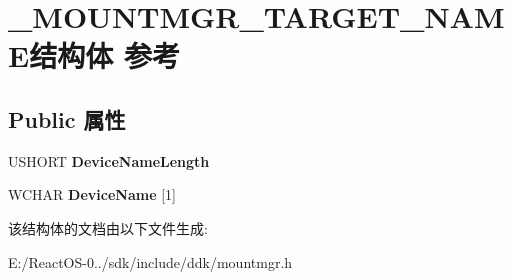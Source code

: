 \hypertarget{struct___m_o_u_n_t_m_g_r___t_a_r_g_e_t___n_a_m_e}{}\section{\+\_\+\+M\+O\+U\+N\+T\+M\+G\+R\+\_\+\+T\+A\+R\+G\+E\+T\+\_\+\+N\+A\+M\+E结构体 参考}
\label{struct___m_o_u_n_t_m_g_r___t_a_r_g_e_t___n_a_m_e}
\subsection*{Public 属性}
\begin{DoxyCompactItemize}
\item 
\mbox{\label{struct___m_o_u_n_t_m_g_r___t_a_r_g_e_t___n_a_m_e_ad8126c1ce871ffc6736e5ccb4caf3406}} 
U\+S\+H\+O\+RT {\bfseries Device\+Name\+Length}
\item 
\mbox{\label{struct___m_o_u_n_t_m_g_r___t_a_r_g_e_t___n_a_m_e_afaec075df4595018202c911adcf27631}} 
W\+C\+H\+AR {\bfseries Device\+Name} \mbox{[}1\mbox{]}
\end{DoxyCompactItemize}


该结构体的文档由以下文件生成\+:\begin{DoxyCompactItemize}
\item 
E\+:/\+React\+O\+S-\/0../sdk/include/ddk/mountmgr.\+h\end{DoxyCompactItemize}
